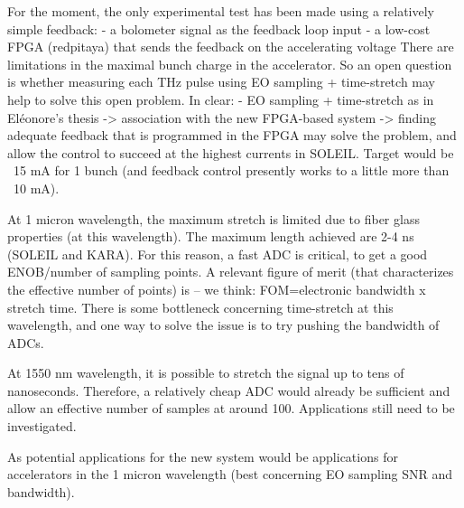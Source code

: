 For the moment, the only experimental test has been made using a relatively simple feedback:
- a bolometer signal as the feedback loop input
- a low-cost FPGA (redpitaya) that sends the feedback on the accelerating voltage
There are limitations in the maximal bunch charge in the accelerator. So an open question is whether measuring each THz pulse using EO sampling + time-stretch may help to solve this open problem. In clear:
- EO sampling + time-stretch as in Eléonore's thesis
-> association with the new FPGA-based system
-> finding adequate feedback that is programmed in the FPGA
may solve the problem, and allow the control to succeed at the highest currents in SOLEIL. 
Target would be ~15 mA for 1 bunch (and feedback control presently works to a little more than ~10 mA).

At 1 micron wavelength, the maximum stretch is limited due to fiber glass properties (at this wavelength). The maximum length achieved are 2-4 ns (SOLEIL and KARA). For this reason, a fast ADC is critical, to get a good ENOB/number of sampling points. A relevant figure of merit (that characterizes the effective number of points) is -- we think: FOM=electronic bandwidth x stretch time. There is some bottleneck concerning time-stretch at this wavelength, and one way to solve the issue is to try pushing the bandwidth of ADCs.

At 1550 nm wavelength, it is possible to stretch the signal up to tens of nanoseconds. Therefore, a relatively cheap ADC would already be sufficient and allow an effective number of samples at around 100. Applications still need to be investigated.

As potential applications for the new system would be applications for accelerators in the 1 micron wavelength (best concerning EO sampling SNR and bandwidth).

